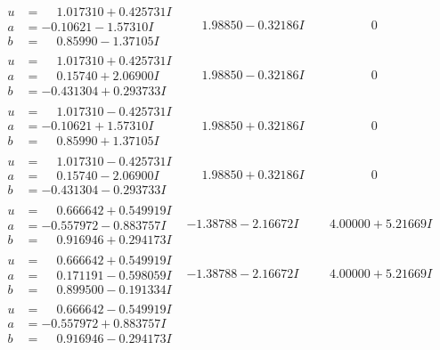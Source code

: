 \documentclass[1p]{elsarticle_modified}
\theoremstyle{definition}
\begin{document}
$$\begin{array}{c|c|c}
\begin{aligned}
u &= \phantom{-}1.017310 + 0.425731 I \\
a &= -0.10621 - 1.57310 I \\
b &= \phantom{-}0.85990 - 1.37105 I\end{aligned}
 & \phantom{-}1.98850 - 0.32186 I & \phantom{-0.000000 } 0 \\ \hline\begin{aligned}
u &= \phantom{-}1.017310 + 0.425731 I \\
a &= \phantom{-}0.15740 + 2.06900 I \\
b &= -0.431304 + 0.293733 I\end{aligned}
 & \phantom{-}1.98850 - 0.32186 I & \phantom{-0.000000 } 0 \\ \hline\begin{aligned}
u &= \phantom{-}1.017310 - 0.425731 I \\
a &= -0.10621 + 1.57310 I \\
b &= \phantom{-}0.85990 + 1.37105 I\end{aligned}
 & \phantom{-}1.98850 + 0.32186 I & \phantom{-0.000000 } 0 \\ \hline\begin{aligned}
u &= \phantom{-}1.017310 - 0.425731 I \\
a &= \phantom{-}0.15740 - 2.06900 I \\
b &= -0.431304 - 0.293733 I\end{aligned}
 & \phantom{-}1.98850 + 0.32186 I & \phantom{-0.000000 } 0 \\ \hline\begin{aligned}
u &= \phantom{-}0.666642 + 0.549919 I \\
a &= -0.557972 - 0.883757 I \\
b &= \phantom{-}0.916946 + 0.294173 I\end{aligned}
 & -1.38788 - 2.16672 I & \phantom{-}4.00000 + 5.21669 I \\ \hline\begin{aligned}
u &= \phantom{-}0.666642 + 0.549919 I \\
a &= \phantom{-}0.171191 - 0.598059 I \\
b &= \phantom{-}0.899500 - 0.191334 I\end{aligned}
 & -1.38788 - 2.16672 I & \phantom{-}4.00000 + 5.21669 I \\ \hline\begin{aligned}
u &= \phantom{-}0.666642 - 0.549919 I \\
a &= -0.557972 + 0.883757 I \\
b &= \phantom{-}0.916946 - 0.294173 I\end{aligned}

\end{array}$$
\end{document}
